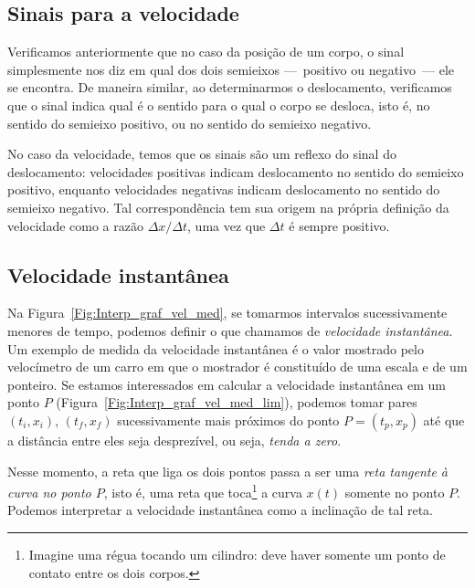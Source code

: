 \subsection{Sinais para a velocidade}

Verificamos anteriormente que no caso da posição de um corpo, o sinal simplesmente nos diz em qual dos dois semieixos ---~positivo ou negativo~--- ele se encontra. De maneira similar, ao determinarmos o deslocamento, verificamos que o sinal indica qual é o sentido para o qual o corpo se desloca, isto é, no sentido do semieixo positivo, ou no sentido do semieixo negativo.

No caso da velocidade, temos que os sinais são um reflexo do sinal do deslocamento: velocidades positivas indicam deslocamento no sentido do semieixo positivo, enquanto velocidades negativas indicam deslocamento no sentido do semieixo negativo. Tal correspondência tem sua origem na própria definição da velocidade como a razão $\Delta x / \Delta t$, uma vez que $\Delta t$ é sempre positivo.

\subsection{Velocidade instantânea}

Na Figura~\ref{Fig:Interp_graf_vel_med}, se tomarmos intervalos sucessivamente menores de tempo, podemos definir o que chamamos de \emph{velocidade instantânea}. Um exemplo de medida da velocidade instantânea é o valor mostrado pelo velocímetro de um carro em que o mostrador é constituído de uma escala e de um ponteiro. Se estamos interessados em calcular a velocidade instantânea em um ponto $P$ (Figura~\ref{Fig:Interp_graf_vel_med_lim}), podemos tomar pares $(t_i, x_i)$, $(t_f, x_f)$ sucessivamente mais próximos do ponto $P = (t_p,x_p)$ até que a distância entre eles seja desprezível, ou seja, \emph{tenda a zero}.

Nesse momento, a reta que liga os dois pontos passa a ser uma \emph{reta tangente à curva no ponto $P$}, isto é, uma reta que toca\footnote[][-2cm]{Imagine uma régua tocando um cilindro: deve haver somente um ponto de contato entre os dois corpos.} a curva $x(t)$ somente no ponto $P$. Podemos interpretar a velocidade instantânea como a inclinação de tal reta.


